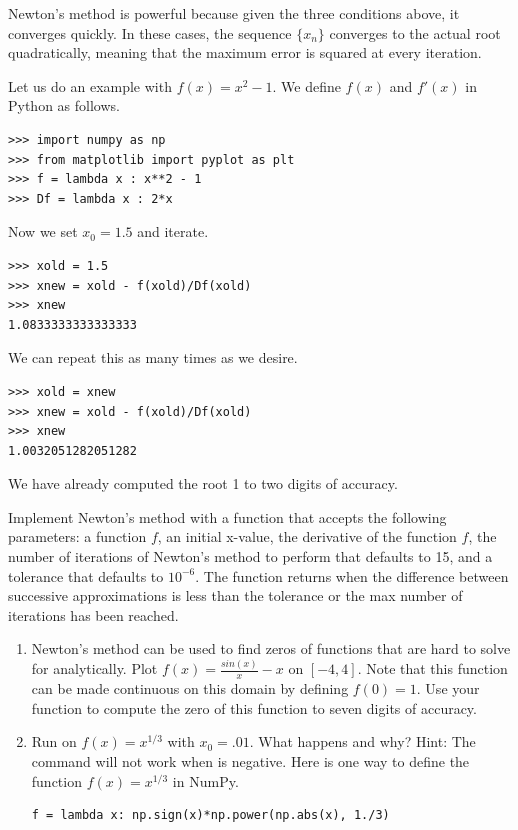 Newton's method is powerful because given the three conditions above, it converges quickly.
In these cases, the sequence $\{x_n\}$ converges to the actual root quadratically, meaning that the maximum error is squared at every iteration.

Let us do an example with $f(x) = x^2-1$.
We define $f(x)$ and $f'(x)$ in Python as follows.
\begin{lstlisting}
>>> import numpy as np
>>> from matplotlib import pyplot as plt
>>> f = lambda x : x**2 - 1
>>> Df = lambda x : 2*x
\end{lstlisting}
Now we set $x_0 = 1.5$ and iterate.
\begin{lstlisting}
>>> xold = 1.5
>>> xnew = xold - f(xold)/Df(xold)
>>> xnew
1.0833333333333333
\end{lstlisting}
We can repeat this as many times as we desire.
\begin{lstlisting}
>>> xold = xnew
>>> xnew = xold - f(xold)/Df(xold)
>>> xnew
1.0032051282051282
\end{lstlisting}
We have already computed the root 1 to two digits of accuracy.


\begin{problem}
\label{prob:newton_arr}
Implement Newton's method with a function that accepts the following parameters: a function $f$, an initial x-value, the derivative of the function $f$, the number of iterations of Newton's method to perform that defaults to 15, and a tolerance that defaults to $10^{-6}$.
The function  returns when the difference between successive approximations is less than the tolerance or the max number of iterations has been reached.
\end{problem}

\begin{problem}
\leavevmode
\begin{enumerate}
\label{prob:functions}

\item Newton's method can be used to find zeros of functions that are hard to solve for analytically.
Plot $f(x) = \frac{sin(x)}{x}-x$ on $[-4, 4]$.
Note that this function can be made continuous on this domain by defining $f(0)=1$.
Use your function  to compute the zero of this function to seven digits of accuracy.
\item Run  on $f(x)=x^{1/3}$ with $x_0=.01$.
What happens and why?
Hint: The command  will not work when  is negative.
Here is one way to define the function $f(x)=x^{1/3}$ in NumPy.
\begin{lstlisting}
f = lambda x: np.sign(x)*np.power(np.abs(x), 1./3)
\end{lstlisting}
\end{enumerate}
\end{problem}

